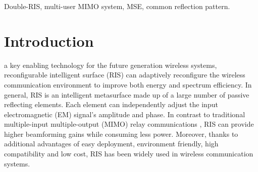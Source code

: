 \documentclass[journal]{IEEEtran}
\begin{document}
\begin{IEEEkeywords}
    Double-RIS, multi-user MIMO system, MSE, common reflection pattern.
\end{IEEEkeywords}

\vspace{-3mm}

\section{Introduction}
 a key enabling technology for the future generation wireless systems, reconfigurable intelligent
surface (RIS) can adaptively reconfigure the wireless communication environment to improve both energy and spectrum  efficiency\cite{9429987,9925080}. %
In general, RIS is an intelligent metasurface made up of a large number of passive reflecting elements. Each element can independently adjust the input  electromagnetic (EM) signal's amplitude and phase\cite{wu2021intelligent}.
In contrast to traditional multiple-input multiple-output (MIMO) relay communications \cite{gong2016millimeter}, RIS can provide higher beamforming gains while consuming less power.
Moreover, thanks to additional advantages of easy deployment, environment friendly, high compatibility and low cost\cite{liu2021reconfigurable}, RIS has been widely used in wireless communication systems.
\end{document}
